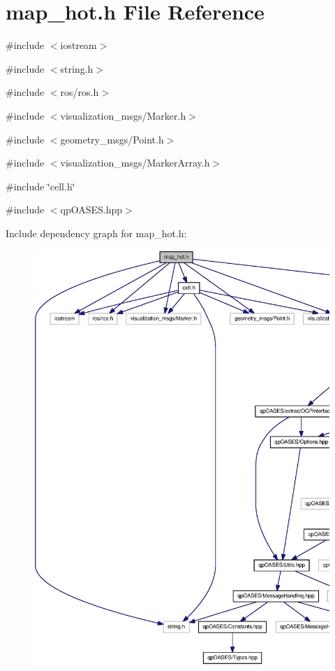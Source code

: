 \section{map\_\-hot.h File Reference}
\label{map__hot_8h}
{\ttfamily \#include $<$iostream$>$}\par
{\ttfamily \#include $<$string.h$>$}\par
{\ttfamily \#include $<$ros/ros.h$>$}\par
{\ttfamily \#include $<$visualization\_\-msgs/Marker.h$>$}\par
{\ttfamily \#include $<$geometry\_\-msgs/Point.h$>$}\par
{\ttfamily \#include $<$visualization\_\-msgs/MarkerArray.h$>$}\par
{\ttfamily \#include \char`\"{}cell.h\char`\"{}}\par
{\ttfamily \#include $<$qpOASES.hpp$>$}\par
Include dependency graph for map\_\-hot.h:
\nopagebreak
\begin{figure}[H]
\begin{center}
\leavevmode
\includegraphics[width=400pt]{map__hot_8h__incl}
\end{center}
\end{figure}
